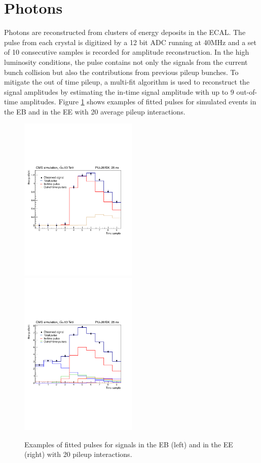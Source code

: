 \documentclass[thesis.tex]{subfiles}
\begin{document}
\section{Photons}

Photons are reconstructed from clusters of energy deposits in the ECAL.
The pulse from each crystal is digitized by a 12 bit ADC running at 40MHz and a set of 10 consecutive samples is recorded for amplitude reconstruction.
In the high luminosity conditions, the pulse contains not only the signals from the current bunch collision but also the contributions from previous pileup bunches.
To mitigate the out of time pileup, a multi-fit algorithm is used to reconstruct the signal amplitudes by estimating the in-time signal amplitude with up to 9 out-of-time amplitudes.
Figure \ref{fig:multifit} shows examples of fitted pulses for simulated events in the EB and in the EE with 20 average pileup interactions.

\begin{figure}[hbtp]
	\includegraphics[width=0.5\textwidth]{plot/multifit_EB.pdf}
	\includegraphics[width=0.5\textwidth]{plot/multifit_EE.pdf}
	\caption{Examples of fitted pulses for signals in the EB (left) and in the EE (right) with 20 pileup interactions.}
	\label{fig:multifit}
\end{figure}
\end{document}
